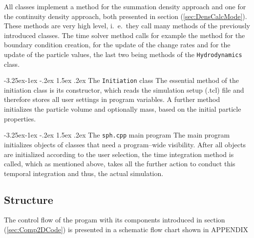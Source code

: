 \documentclass[11pt,a4paper,twoside]{report}
\makeatletter
\renewcommand\paragraph{\@startsection{paragraph}{4}{\z@}%
  {-3.25ex\@plus -1ex \@minus -.2ex}%
  {1.5ex \@plus .2ex}%
  {\normalfont\normalsize\bfseries}}
\makeatother
\begin{document}
All classes implement a method for the summation density approach and one for the continuity density approach, both presented in section (\ref{sec:DensCalcMode}).
These methods are very high level, i.\ e.\ they call many methods of the previously introduced classes. The time solver method calls for example the method for the boundary condition creation, for the update of the change rates and for the update of the particle values, the last two being methods of the {\tt Hydrodynamics} class.


\paragraph{The {\tt Initiation} class}
The essential method of the initiation class is its constructor, which reads the simulation setup (.tcl) file and therefore stores all user settings in program variables. A further method initializes the particle volume and optionally mass, based on the initial particle properties.

\paragraph{The {\tt sph.cpp} main program}
The main program initializes objects of classes that need a program--wide visibility. 
After all objects are initialized according to the user selection, the time integration method is called, which as mentioned above, takes all the further action to conduct this temporal integration and thus, the actual simulation. 




\subsection{Structure}
\label{sec:Struc2DCode}
The control flow of the progam with its components introduced in section (\ref{sec:Comp2DCode}) is presented in a schematic flow chart shown in APPENDIX
\end{document}
